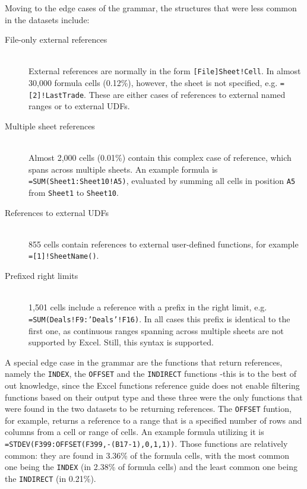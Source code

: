 \documentclass[conference]{IEEEtran}
\begin{document}
Moving to the edge cases of the grammar, the structures that were less common in the datasets include:

\begin{description}
	\item[File-only external references] \hfill \\
		External references are normally in the form \texttt{[File]Sheet!Cell}. In almost 30,000 formula cells (0.12\%), however, the sheet is not specified, e.g. \texttt{=[2]!LastTrade}. These are either cases of references to external named ranges or to external UDFs.
	\item[Multiple sheet references] \hfill \\
	 Almost 2,000 cells (0.01\%) contain this complex case of reference, which spans across multiple sheets. An example formula is \texttt{=SUM(Sheet1:Sheet10!A5)}, evaluated by summing all cells in position \texttt{A5} from \texttt{Sheet1} to \texttt{Sheet10}.
	\item[References to external UDFs] \hfill \\
	855 cells contain references to external user-defined functions, for example \texttt{=[1]!SheetName()}.
	\item[Prefixed right limits] \hfill \\
	1,501 cells include a reference with a prefix in the right limit, e.g. \texttt{=SUM(Deals!F9:'Deals'!F16)}. In all cases this prefix is identical to the first one, as continuous ranges spanning across multiple sheets are not supported by Excel. Still, this syntax is supported.
\end{description}

A special edge case in the grammar are the functions that return references, namely the \texttt{INDEX}, the \texttt{OFFSET} and the \texttt{INDIRECT} functions -this is to the best of out knowledge, since the Excel functions reference guide does not enable filtering functions based on their output type and these three were the only functions that were found in the two datasets to be returning references. The \texttt{OFFSET} funtion, for example, returns a reference to a range that is a specified number of rows and columns from a cell or range of cells. An example formula utilizing it is \texttt{=STDEV(F399:OFFSET(F399,-(B17-1),0,1,1))}. Those functions are relatively common: they are found in 3.36\% of the formula cells, with the most common one being the \texttt{INDEX} (in 2.38\% of formula cells) and the least common one being the \texttt{INDIRECT} (in 0.21\%).
\end{document}
